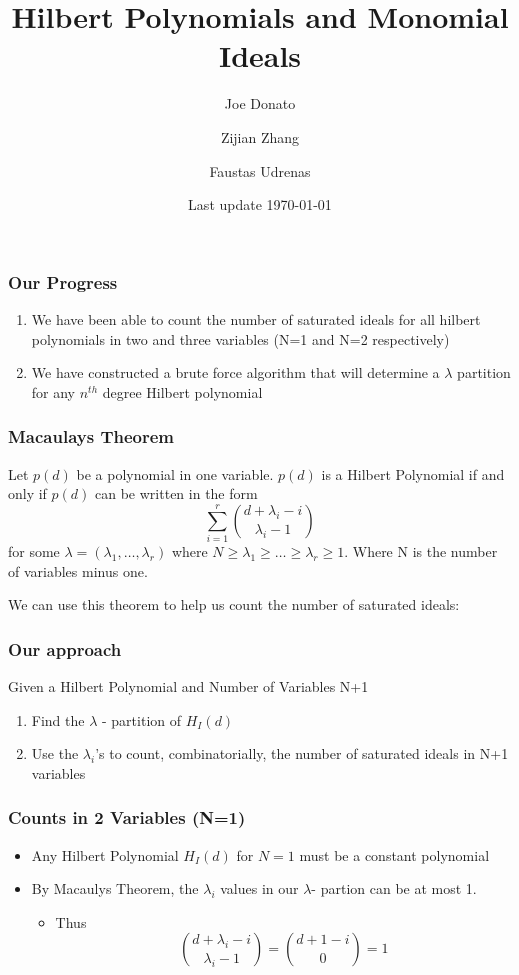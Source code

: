 \documentclass{beamer}
\title[University of Michigan LoG(M)]{Hilbert Polynomials and Monomial Ideals}
\author{Joe Donato \and Zijian Zhang \and Faustas Udrenas }
\institute{University of Michigan}
\date{Last update \today}
\begin{document}
\begin{frame}
\titlepage
\end{frame}




\begin{frame}
	\frametitle{Our Progress}
	\begin{enumerate}
	\item We have been able to count the number of saturated ideals for all hilbert polynomials in two and three variables (N=1 and N=2 respectively)
	\item We have constructed a brute force algorithm that will determine a $\lambda$ partition for any $n^{th}$ degree Hilbert polynomial
	\end{enumerate}
\end{frame}

\begin{frame}
	\frametitle{Macaulays Theorem}
	\begin{theorem}
   Let $p(d)$ be a polynomial in one variable. $p(d)$ is a Hilbert Polynomial if and only if $p(d)$ can be written in the form 
   \[\sum_{i=1}^{r}\binom{d+\lambda_i -i}{\lambda_i -1}\] for some $\lambda= (\lambda_1,\hdots,\lambda_r)$  where $N \geq \lambda_1 \geq \hdots \geq \lambda_r \geq 1$. Where N is the number of variables minus one.

	\end{theorem}
	We can use this theorem to help us count the number of saturated ideals:
\end{frame}


\begin{frame}
	\frametitle{Our approach}
	Given a Hilbert Polynomial and Number of Variables N+1
	\begin{enumerate}
	\item Find the $\lambda$ - partition of $H_I(d)$ 
	\item Use the $\lambda_i$'s to count, combinatorially, the number of saturated ideals in N+1 variables
	\end{enumerate}
\end{frame}

\begin{frame}
	\frametitle{Counts in 2 Variables (N=1)}
	\begin{itemize}
	\item Any Hilbert Polynomial $H_I(d)$ for $N=1$ must be a constant polynomial
	\item By Macaulys Theorem, the $\lambda_i$ values in our $\lambda$- partion can be at most 1.
	\begin{itemize}
		\item Thus \[ \binom{d+\lambda_i -i}{\lambda_i-1} = \binom{d+1-i}{0} =1
		\]
	\end{itemize}
	\end{itemize}
\end{frame}
\end{document}
